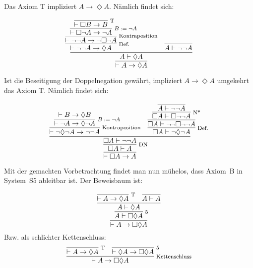 \documentclass[8pt]{beamer}
\newcommand{\infernote}[1]{\!\text{\footnotesize #1}}
\newcommand{\cond}{\rightarrow}
\newcommand{\lnec}{\Box}
\newcommand{\lpos}{\Diamond}
\begin{document}
\begin{frame}
Das Axiom T impliziert $A\cond\lpos A$. Nämlich findet sich:

\[
\infer{\vdash A\cond\lpos A}{
  \infer{A\vdash\lpos A}{
    \infer[\infernote{Def.}]{\vdash\neg\neg A\cond\lpos A}{
      \infer[\infernote{Kontraposition}]{\vdash\neg\neg A\cond\neg\lnec\neg A}{
        \infer[\infernote{$B:=\neg A$}]{\vdash\lnec\neg A\cond\neg A}{
          \infer[\infernote{T}]{\vdash\lnec B\cond B}{}}}}
  & \infer{A\vdash\neg\neg A}{}}}
\]\pause

Ist die Beseitigung der Doppelnegation gewährt, impliziert
$A\cond\lpos A$ umgekehrt das Axiom T. Nämlich findet sich:

\[
\infer{\vdash\lnec A\cond A}{
  \infer[\infernote{DN}]{\lnec A\vdash A}{
    \infer{\lnec A\vdash\neg\neg A}{
      \infer[\infernote{Kontraposition}]{\vdash\neg\lpos\neg A\cond\neg\neg A}{
        \infer[\infernote{$B:=\neg A$}]{\vdash\neg A\cond\lpos\neg A}{
          \vdash B\cond\lpos B}}
    & \infer[\infernote{Def.}]{\lnec A\vdash\neg\lpos\neg A}{
        \infer{\lnec A\vdash\neg\neg\lnec\neg\neg A}{
          \infer[\infernote{N*}]{\lnec A\vdash\lnec\neg\neg A}{
            \infer{A\vdash\neg\neg A}{}}}}}}}
\]
\end{frame}

\begin{frame}
Mit der gemachten Vorbetrachtung findet man nun mühelos, dass Axiom~B
in System~S5 ableitbar ist. Der Beweisbaum ist:\pause

\[
\infer{\vdash A\cond\lnec\lpos A}{
  \infer[\infernote{5}]{A\vdash\lnec\lpos A}{
    \infer{A\vdash\lpos A}{
      \infer[\infernote{T}]{\vdash A\cond\lpos A}{}
    & \infer{A\vdash A}{}}}}
\]
Bzw. als schlichter Kettenschluss:
\[
\infer[\infernote{Kettenschluss}]{\vdash A\cond\lnec\lpos A}{
  \infer[\infernote{T}]{\vdash A\cond\lpos A}{}
& \infer[\infernote{5}]{\vdash\lpos A\cond\lnec\lpos A}{}
}
\]
\end{frame}
\end{document}
